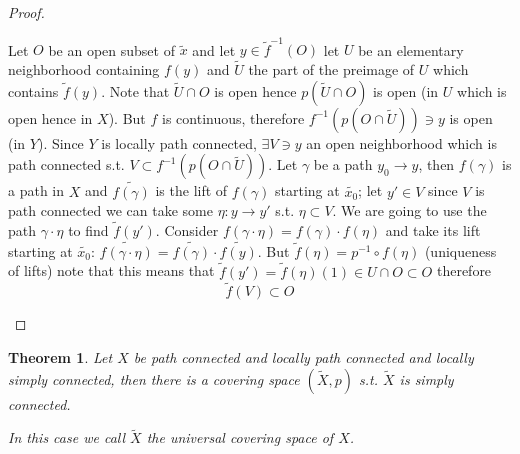 \documentclass[11pt,a4paper]{article}
\theoremstyle{definition}
\theoremstyle{plain}
\newtheorem{theorem}[definition]{Theorem}
\theoremstyle{remark}
\newcommand{\1}{\mathbbm{1}}
\begin{document}
\begin{proof}
\begin{itemize}
        Let $O$ be an open subset of $\tilde{x}$ and let $y \in \tilde{f}^{-1}(O)$ let $U$ be an elementary neighborhood containing $f(y)$ and $\tilde{U}$ the part of the preimage of $U$ 
        which contains $\tilde{f} (y)$. Note that $\tilde{U} \cap O$ is open hence $p(\tilde{U} \cap O)$ is open (in $U$ which is open hence in $X$). 
        But $f$ is continuous, therefore $f^{-1} (p(O \cap \tilde{U})) \ni y$ is open (in $Y$). Since $Y$ is locally path connected, $\exists V \ni y$ an open neighborhood 
        which is path connected s.t. $V \subset f^{-1} (p(O \cap \tilde{U}))$. Let $\gamma$ be a path $y_0 \to y$, then $f(\gamma)$ is a path in $X$ and $\tilde{f (\gamma)}$ is the lift of 
        $f(\gamma)$ starting at $\tilde{x_0}$; let $y' \in V$ since $V$ is path connected we can take some $\eta \colon y \to y'$ s.t. $\eta \subset V$.
        We are going to use the path $\gamma \cdot \eta$ to find $\tilde{f} (y')$. Consider $f(\gamma \cdot \eta) = f(\gamma) \cdot f(\eta)$ and take its lift 
        starting at $\tilde{x_0}$: $\tilde{f(\gamma \cdot \eta)} = \tilde{f(\gamma)} \cdot \tilde{f(y)}$. But $\tilde{f} (\eta) = p^{-1} \circ f (\eta)$ (uniqueness of lifts)
        note that this means that $\tilde{f}(y') = \tilde{f}(\eta) (1) \in U \cap O \subset O$ therefore 
        $$\tilde{f} (V) \subset O$$ 
    \end{itemize}
\end{proof}

\begin{theorem}
    Let $X$ be path connected and locally path connected and locally simply connected, then there is a covering space $(\tilde{X}, p)$ s.t. 
    $\tilde{X}$ is simply connected.

    In this case we call $\tilde{X}$ the universal covering space of $X$.
\end{theorem}
\end{document}
